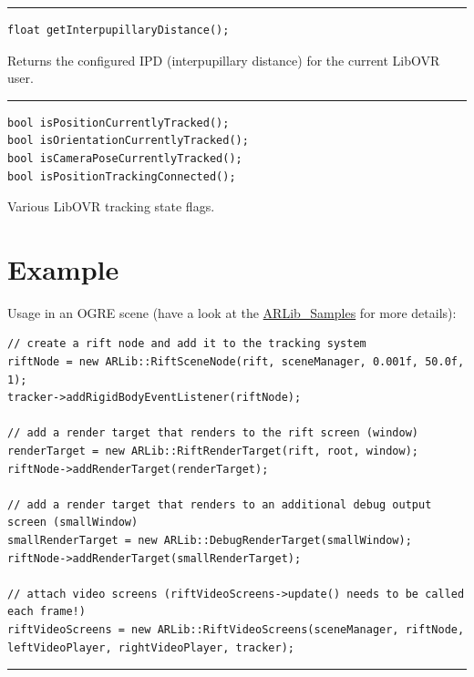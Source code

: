 \documentclass[]{article}
\begin{document}
\begin{center}\rule{0.5\linewidth}{\linethickness}\end{center}

\begin{verbatim}
float getInterpupillaryDistance();
\end{verbatim}

Returns the configured IPD (interpupillary distance) for the current
LibOVR user.

\begin{center}\rule{0.5\linewidth}{\linethickness}\end{center}

\begin{verbatim}
bool isPositionCurrentlyTracked();
bool isOrientationCurrentlyTracked();
bool isCameraPoseCurrentlyTracked();
bool isPositionTrackingConnected();
\end{verbatim}

Various LibOVR tracking state flags.

\section{Example}\label{example}

Usage in an OGRE scene (have a look at the
\href{https://github.com/ands/OculusMeetsAR/tree/master/ARLib_Samples}{ARLib\_Samples}
for more details):

\begin{verbatim}
// create a rift node and add it to the tracking system
riftNode = new ARLib::RiftSceneNode(rift, sceneManager, 0.001f, 50.0f, 1);
tracker->addRigidBodyEventListener(riftNode);

// add a render target that renders to the rift screen (window)
renderTarget = new ARLib::RiftRenderTarget(rift, root, window);
riftNode->addRenderTarget(renderTarget);

// add a render target that renders to an additional debug output screen (smallWindow)
smallRenderTarget = new ARLib::DebugRenderTarget(smallWindow);
riftNode->addRenderTarget(smallRenderTarget);

// attach video screens (riftVideoScreens->update() needs to be called each frame!)
riftVideoScreens = new ARLib::RiftVideoScreens(sceneManager, riftNode, leftVideoPlayer, rightVideoPlayer, tracker);
\end{verbatim}

\begin{center}\rule{0.5\linewidth}{\linethickness}\end{center}
\end{document}
